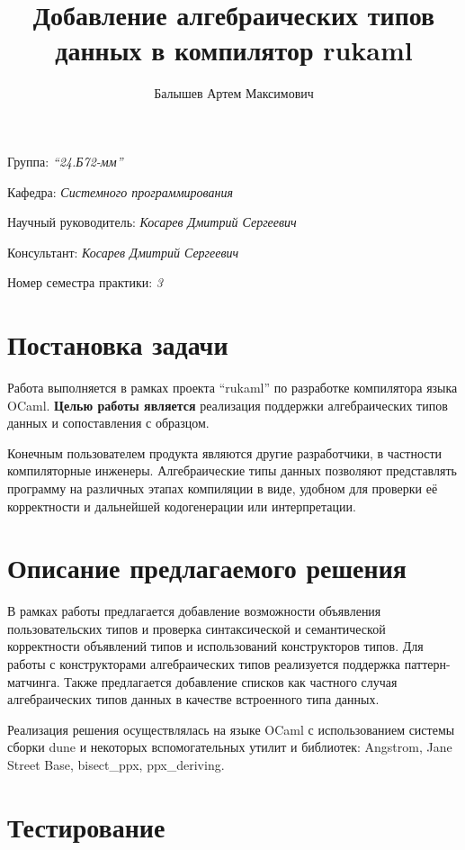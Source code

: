 \documentclass[a4paper]{article}
\title{Добавление алгебраических типов данных в компилятор rukaml}
\author{Балышев Артем Максимович}
\date{}
\begin{document}
\maketitle

\begin{flushright}
    Группа: \emph{\enquote{24.Б72-мм}}

    Кафедра: \emph{Системного программирования}

    Научный руководитель: \emph{Косарев Дмитрий Сергеевич}

    Консультант: \emph{Косарев Дмитрий Сергеевич}

    Номер семестра практики: \emph{3}
\end{flushright}


\section{Постановка задачи}

Работа выполняется в рамках проекта \enquote{rukaml} по разработке компилятора языка OCaml. \textbf{Целью работы является} реализация поддержки алгебраических типов данных и сопоставления с образцом.

Конечным пользователем продукта являются другие разработчики, в частности компиляторные инженеры. Алгебраические типы данных позволяют представлять программу на различных этапах компиляции в виде, удобном для проверки её корректности и дальнейшей кодогенерации или интерпретации.

\section{Описание предлагаемого решения}

В рамках работы предлагается добавление возможности объявления пользовательских типов и проверка синтаксической и семантической корректности объявлений типов и использований конструкторов типов.
Для работы с конструкторами алгебраических типов реализуется поддержка паттерн-матчинга.
Также предлагается добавление списков как частного случая алгебраических типов данных в качестве встроенного типа данных.


Реализация решения осуществлялась на языке OCaml с использованием системы сборки dune и некоторых вспомогательных утилит и библиотек: Angstrom, Jane Street Base, bisect\_ppx, ppx\_deriving.

\section{Тестирование}
\end{document}
